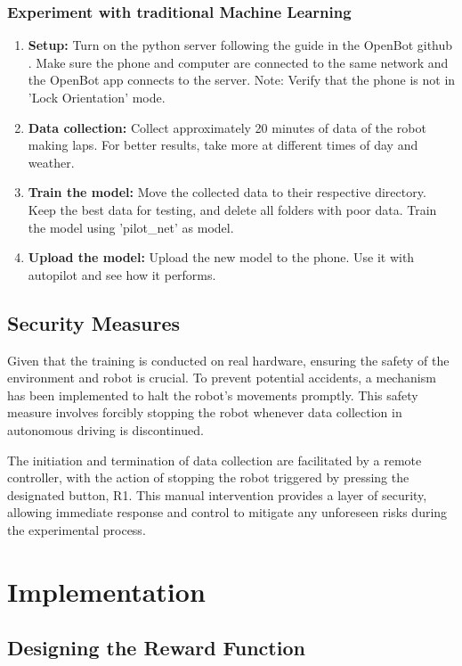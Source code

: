 \documentclass[12pt]{report}
\begin{document}
\subsubsection{Experiment with traditional Machine Learning}
\begin{enumerate}
    \item \textbf{Setup: } Turn on the python server following the guide in the OpenBot github \cite{bib:git_openbot}. Make sure the phone and computer are connected to the same network and the OpenBot app connects to the server. Note: Verify that the phone is not in 'Lock Orientation' mode.
    \item \textbf{Data collection: } Collect approximately 20 minutes of data of the robot making laps. For better results, take more at different times of day and weather.
    \item \textbf{Train the model: } Move the collected data to their respective directory. Keep the best data for testing, and delete all folders with poor data. Train the model using 'pilot\_net' as model.
    \item \textbf{Upload the model: } Upload the new model to the phone. Use it with autopilot and see how it performs.
\end{enumerate}

\subsection{Security Measures}
\label{sub:security}

Given that the training is conducted on real hardware, ensuring the safety of the environment and robot is crucial. To prevent potential accidents, a mechanism has been implemented to halt the robot's movements promptly. This safety measure involves forcibly stopping the robot whenever data collection in autonomous driving is discontinued.

The initiation and termination of data collection are facilitated by a remote controller, with the action of stopping the robot triggered by pressing the designated button, R1. This manual intervention provides a layer of security, allowing immediate response and control to mitigate any unforeseen risks during the experimental process.

\section{Implementation}
\subsection{Designing the Reward Function}
\label{sub:Designing_the_reward_function}
\end{document}
